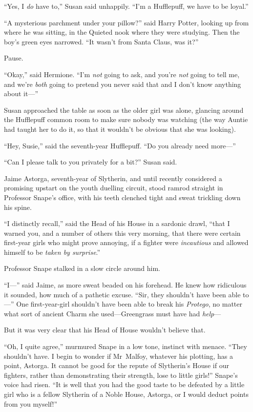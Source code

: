 “Yes, I \emph{do} have to,” Susan said unhappily. “I’m a Hufflepuff, we have to be loyal.”

\later

“A mysterious parchment under your pillow?” said Harry Potter, looking up from where he was sitting, in the Quieted nook where they were studying. Then the boy’s green eyes narrowed. “It wasn’t from Santa Claus, was it?”

Pause.

“Okay,” said Hermione. “I’m \emph{not} going to ask, and you’re \emph{not} going to tell me, and we’re \emph{both} going to pretend you never said that and I don’t know anything about it—”

\later

Susan approached the table as soon as the older girl was alone, glancing around the Hufflepuff common room to make sure nobody was watching (the way Auntie had taught her to do it, so that it wouldn’t be obvious that she was looking).

“Hey, Susie,” said the seventh-year Hufflepuff. “Do you already need more—”

“Can I please talk to you privately for a bit?” Susan said.

\later

Jaime Astorga, seventh-year of Slytherin, and until recently considered a promising upstart on the youth duelling circuit, stood ramrod straight in Professor Snape’s office, with his teeth clenched tight and sweat trickling down his spine.

“I distinctly recall,” said the Head of his House in a sardonic drawl, “that I warned you, and a number of others this very morning, that there were certain first-year girls who might prove annoying, if a fighter were \emph{incautious} and allowed himself to be \emph{taken by surprise}.”

Professor Snape stalked in a slow circle around him.

“I—” said Jaime, as more sweat beaded on his forehead. He knew how ridiculous it sounded, how much of a pathetic excuse. “Sir, they shouldn’t have been able to—” One first-year-girl shouldn’t have been able to break his \emph{Protego}, no matter what sort of ancient Charm she used—Greengrass must have had \emph{help}—

But it was very clear that his Head of House wouldn’t believe that.

“Oh, I quite agree,” murmured Snape in a low tone, instinct with menace. “They shouldn’t have. I begin to wonder if Mr~Malfoy, whatever his plotting, has a point, Astorga. It cannot be good for the repute of Slytherin’s House if our fighters, rather than demonstrating their strength, lose to little girls!” Snape’s voice had risen. “It is well that you had the good taste to be defeated by a little girl who is a fellow Slytherin of a Noble House, Astorga, or I would deduct points from you myself!”

